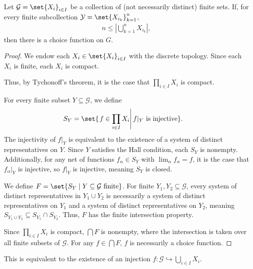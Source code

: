 %
%
\begin{theorem}
  Let $\mathcal{G} = \set{X_{i}}_{i\in I}$ be a collection of (not necessarily distinct) finite sets. If, for every finite subcollection $\mathcal{Y} = \set{X_{i_k}}_{k=1}^{n}$,
  \begin{align*}
    n\leq \left\vert \bigcup_{k=1}^{n}X_{i_k} \right\vert,
  \end{align*}
  then there is a choice function on $G$.
\end{theorem}
\begin{proof}
  We endow each $X_i\in \set{X_{i}}_{i\in I}$ with the discrete topology. Since each $X_i$ is finite, each $X_i$ is compact.\newline

  Thus, by Tychonoff's theorem, it is the case that $\prod_{i\in I}X_{i}$ is compact.\newline

  For every finite subset $Y\subseteq \mathcal{G}$, we define
  \begin{align*}
    S_Y &= \set{\left.f\in \prod_{i\in I}X_i\right|f|_{Y}\text{ is injective}}.
  \end{align*}
  The injectivity of $f|_{Y}$ is equivalent to the existence of a system of distinct representatives on $Y$. Since $Y$ satisfies the Hall condition, each $S_{Y}$ is nonempty. Additionally, for any net of functions $f_{\alpha}\in S_{Y}$ with $\lim_{\alpha}f_{\alpha} = f$, it is the case that $f_{\alpha}|_{Y}$ is injective, so $f|_{Y}$ is injective, meaning $S_{Y}$ is closed.\newline

  We define $F = \set{S_{Y}\mid Y\subseteq \mathcal{G}\text{ finite}}$. For finite $Y_{1},Y_{2}\subseteq \mathcal{G}$, every system of distinct representatives in $Y_1\cup Y_2$ is necessarily a system of distinct representatives on $Y_1$ and a system of distinct representatives on $Y_{2}$, meaning $S_{Y_1\cup Y_2}\subseteq S_{Y_1}\cap S_{Y_2}$. Thus, $F$ has the finite intersection property.\newline

  Since $\prod_{i\in I}X_i$ is compact, $\bigcap F$ is nonempty, where the intersection is taken over all finite subsets of $\mathcal{G}$. For any $f\in \bigcap F$, $f$ is necessarily a choice function.
\end{proof}
\begin{remark}
  This is equivalent to the existence of an injection $f: \mathcal{G}\hookrightarrow \bigcup_{i\in I}X_i$.
\end{remark}

